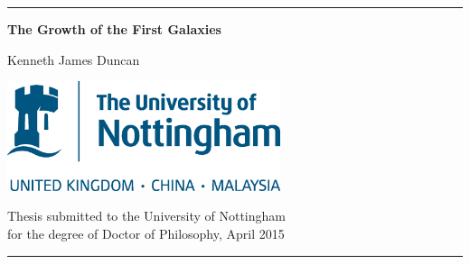 %
%

\newcommand{\HRule}{\rule{\linewidth}{1mm}}
\begin{titlepage}

\begin{center}

\HRule


\LARGE{\textbf{The Growth of the First Galaxies}}


\large{Kenneth James Duncan}



\includegraphics[width=0.6\textwidth]{UoN_BlueCMYK.eps}


	Thesis submitted to the University of Nottingham\\
	for the degree of Doctor of Philosophy, April 2015\\


\HRule
\end{center}

\end{titlepage}


